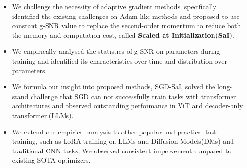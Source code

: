 \begin{itemize}
    \item We challenge the necessity of adaptive gradient methods, specifically identified the existing challenges on Adam-like methods and proposed to use constant g-SNR value to replace the second-order momentum to reduce both the memory and computation cost, called \textbf{Scaled at Initialization(SaI)}.
    \item We empirically analysed the statistics of g-SNR on parameters during training and identified its characteristics over time and distribution over parameters. 
    \item We formula our insight into proposed methods, SGD-SaI, solved the long-stand challenge that SGD can not successfully train tasks with transformer architectures and observed outstanding performance in ViT and decoder-only transformer (LLMs).
    \item We extend our empirical analysis to other popular and practical task training, such as LoRA training on LLMs and Diffusion Models(DMs) and traditional CNN tasks. We observed consistent improvement compared to existing SOTA optimizers.
\end{itemize}

